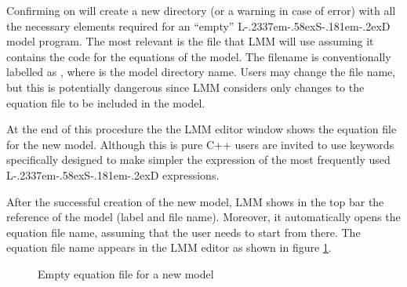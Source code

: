 \documentclass [11pt,a4paper] {book}
\def\LsD{{L\kern-.2337em\lower-.58ex\hbox{S}\kern-.181em\lower-.2ex\hbox{D}}\xspace}
\begin{document}
Confirming on  will create a new directory (or a warning in case of error) with all the necessary elements required for an ``empty'' \LsD model program.  The most relevant is the file that LMM will use assuming it contains the code for the equations of the model. The filename is conventionally labelled as , where  is the model directory name. Users may change the file name, but this is potentially dangerous since LMM considers only changes to the equation file to be included in the model. 

At the end of this procedure the the LMM editor window shows the equation file for the new model. Although this is pure C++ users are invited to use keywords specifically designed to make simpler the expression of the most frequently used \LsD expressions. 

After the successful creation of the new model, LMM shows in the top bar the reference of the model (label and file name). Moreover, it automatically opens the equation file name, assuming that the user needs to start from there. The equation file name appears in the LMM editor as shown in figure \ref{fig:LMMnew}.

\begin{figure}[ht]
  \centering
  \caption{Empty equation file for a new model}
  \label{fig:LMMnew}
\end{figure}
\end{document}
